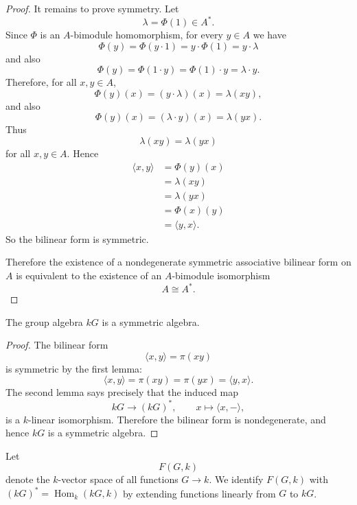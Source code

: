 \begin{proof}
    It remains to prove symmetry. Let
    \[
        \lambda=\Phi(1)\in A^*.
    \]
    Since \(\Phi\) is an \(A\)-bimodule homomorphism, for every \(y\in A\) we have
    \[
        \Phi(y)=\Phi(y\cdot 1)=y\cdot \Phi(1)=y\cdot \lambda
    \]
    and also
    \[
        \Phi(y)=\Phi(1\cdot y)=\Phi(1)\cdot y=\lambda\cdot y.
    \]
    Therefore, for all \(x,y\in A\),
    \[
        \Phi(y)(x)
        =
        (y\cdot \lambda)(x)
        =
        \lambda(xy),
    \]
    and also
    \[
        \Phi(y)(x)
        =
        (\lambda\cdot y)(x)
        =
        \lambda(yx).
    \]
    Thus
    \[
        \lambda(xy)=\lambda(yx)
    \]
    for all \(x,y\in A\). Hence
    \[
        \begin{aligned}
            \langle x,y\rangle
             & =\Phi(y)(x)           \\
             & =\lambda(xy)          \\
             & =\lambda(yx)          \\
             & =\Phi(x)(y)           \\
             & =\langle y,x\rangle .
        \end{aligned}
    \]
    So the bilinear form is symmetric.

    Therefore the existence of a nondegenerate symmetric associative bilinear form
    on \(A\) is equivalent to the existence of an \(A\)-bimodule isomorphism
    \[
        A\cong A^*.
    \]
\end{proof}

\begin{corollary}
    The group algebra \(kG\) is a symmetric algebra.
\end{corollary}

\begin{proof}
    The bilinear form
    \[
        \langle x,y\rangle
        =
        \pi(xy)
    \]
    is symmetric by the first lemma:
    \[
        \langle x,y\rangle
        =
        \pi(xy)
        =
        \pi(yx)
        =
        \langle y,x\rangle.
    \]
    The second lemma says precisely that the induced map
    \[
        kG\longrightarrow (kG)^*,
        \qquad
        x\longmapsto \langle x,-\rangle,
    \]
    is a \(k\)-linear isomorphism. Therefore the bilinear form is nondegenerate,
    and hence \(kG\) is a symmetric algebra.
\end{proof}

Let
\[
    F(G,k)
\]
denote the \(k\)-vector space of all functions \(G\to k\). We identify
\(F(G,k)\) with \((kG)^*=\operatorname{Hom}_k(kG,k)\) by extending functions
linearly from \(G\) to \(kG\).

